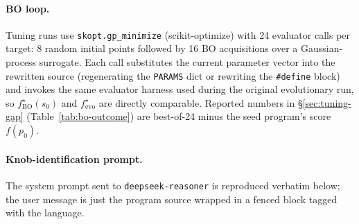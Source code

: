\paragraph{BO loop.}
Tuning runs use \texttt{skopt.gp\_minimize} (scikit-optimize) with 24 evaluator calls per target: 8 random initial points followed by 16 BO acquisitions over a Gaussian-process surrogate. Each call substitutes the current parameter vector into the rewritten source (regenerating the \texttt{PARAMS} dict or rewriting the \texttt{\#define} block) and invokes the same evaluator harness used during the original evolutionary run, so $f^{\star}_{\mathrm{BO}}(s_0)$ and $f^{\star}_{\mathrm{evo}}$ are directly comparable. Reported numbers in \S\ref{sec:tuning-gap} (Table~\ref{tab:bo-outcome}) are best-of-24 minus the seed program's score $f(p_0)$.

\paragraph{Knob-identification prompt.}
The system prompt sent to \texttt{deepseek-reasoner} is reproduced verbatim below; the user message is just the program source wrapped in a fenced block tagged with the language.

